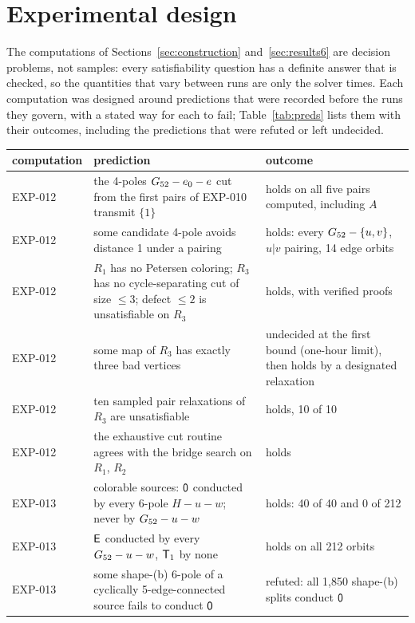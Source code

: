 \section{Experimental design}\label{sec:design}

The computations of Sections~\ref{sec:construction} and~\ref{sec:results6} are decision problems, not samples: every
satisfiability question has a definite answer that is checked, so the quantities that vary between runs are only the solver times.
Each computation was designed around predictions that were recorded before the runs they govern, with a stated way for each
to fail; Table~\ref{tab:preds} lists them with their outcomes, including the predictions that were refuted or left undecided.

\begin{table}[t]\centering\footnotesize
\begin{tabular}{p{1.9cm}>{\raggedright\arraybackslash}p{6.2cm}>{\raggedright\arraybackslash}p{5.5cm}}
\toprule
computation & prediction & outcome \\
\midrule
EXP-012 & the 4-poles $G_{52} - e_0 - e$ cut from the first pairs of EXP-010 transmit $\{1\}$ & holds on all five pairs computed, including $A$ \\
EXP-012 & some candidate 4-pole avoids distance 1 under a pairing & holds: every $G_{52} - \{u,v\}$, $u|v$ pairing, 14 edge orbits \\
EXP-012 & $R_1$ has no Petersen coloring; $R_3$ has no cycle-separating cut of size $\le 3$; defect $\le 2$ is unsatisfiable on $R_3$ & holds, with verified proofs \\
EXP-012 & some map of $R_3$ has exactly three bad vertices & undecided at the first bound (one-hour limit), then holds by a designated relaxation \\
EXP-012 & ten sampled pair relaxations of $R_3$ are unsatisfiable & holds, 10 of 10 \\
EXP-012 & the exhaustive cut routine agrees with the bridge search on $R_1$, $R_2$ & holds \\
\midrule
EXP-013 & colorable sources: $\mathsf{0}$ conducted by every 6-pole $H - u - w$; never by $G_{52} - u - w$ & holds: 40 of 40 and 0 of 212 \\
EXP-013 & $\mathsf{E}$ conducted by every $G_{52} - u - w$, $\mathsf{T}_1$ by none & holds on all 212 orbits \\
EXP-013 & some shape-(b) 6-pole of a cyclically 5-edge-connected source fails to conduct $\mathsf{0}$ & refuted: all 1,850 shape-(b) splits conduct $\mathsf{0}$ \\

\end{tabular}
\end{table}
